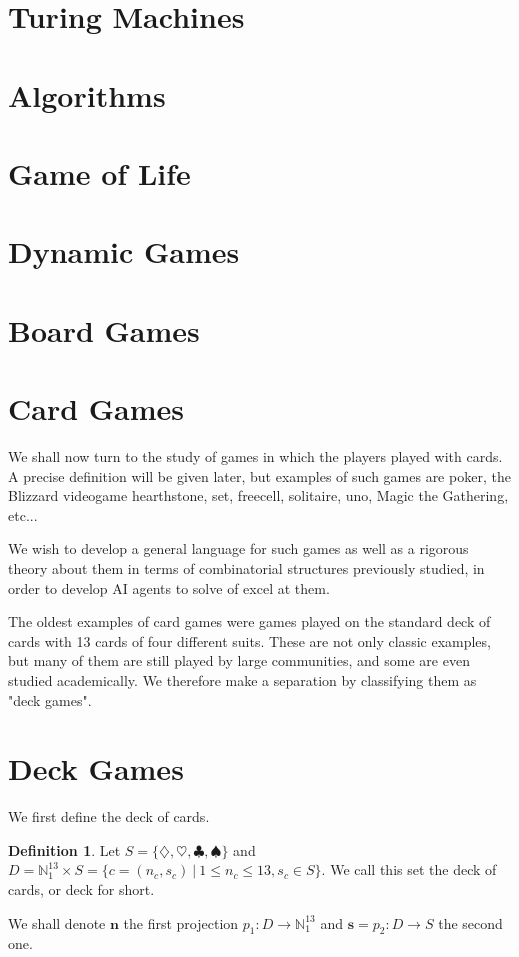 \documentclass[]{article}
\theoremstyle{definition}
\newtheorem{definition}{Definition}[section]
\theoremstyle{definition}
\newcommand{\raw}{\rightarrow}
\newcommand{\bb}{\mathbb}
\begin{document}
\section{Turing Machines}
\section{Algorithms}
\section{Game of Life}
\section{Dynamic Games}
\section{Board Games}
\section{Card Games}

We shall now turn to the study of games in which the players played with cards. A precise definition will be given later, but examples of such games are poker, the Blizzard videogame hearthstone, set, freecell, solitaire, uno, Magic the Gathering, etc...

We wish to develop a general language for such games as well as a rigorous theory about them in terms of combinatorial structures previously studied, in order to develop AI agents to solve of excel at them.

The oldest examples of card games were games played on the standard deck of cards with 13 cards of four different suits. These are not only classic examples, but many of them are still played by large communities, and some are even studied academically. We therefore make a separation by classifying them as "deck games".

\section{Deck Games}

We first define the deck of cards. 

\begin{definition}

	Let $S = \{ \diamondsuit, \heartsuit, \clubsuit, \spadesuit \}$ and $D = \bb{N}_1^{13} \times S = \{ c = (n_c, s_c)\ | \ 1 \leq n_c \leq 13, s_c \in S \}$. We call this set the deck of cards, or deck for short. 
	
	We shall denote $\textbf{n}$ the first projection $p_1: D \raw \bb{N}_1^{13}$ and $\textbf{s} = p_2: D \raw S$ the second one. 
	
\end{definition}
\end{document}
